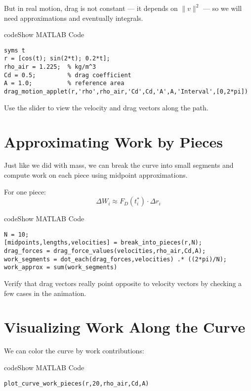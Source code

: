 \documentclass{ximera}
\begin{document}
But in real motion, drag is not constant — it depends on $\|v\|^2$ — so we will need approximations and eventually integrals.

\begin{expandable}{code}{Show MATLAB Code}
\begin{verbatim}
syms t
r = [cos(t); sin(2*t); 0.2*t];
rho_air = 1.225;  % kg/m^3
Cd = 0.5;         % drag coefficient
A = 1.0;          % reference area
drag_motion_applet(r,'rho',rho_air,'Cd',Cd,'A',A,'Interval',[0,2*pi])
\end{verbatim}
\end{expandable}

Use the slider to view the velocity and drag vectors along the path.

\section*{Approximating Work by Pieces}

Just like we did with mass, we can break the curve into small segments and compute work on each piece using midpoint approximations.

For one piece:
$$
\Delta W_i \approx F_D(t_i^*) \cdot \Delta r_i
$$

\begin{expandable}{code}{Show MATLAB Code}
\begin{verbatim}
N = 10;
[midpoints,lengths,velocities] = break_into_pieces(r,N);
drag_forces = drag_force_values(velocities,rho_air,Cd,A);
work_segments = dot_each(drag_forces,velocities) .* ((2*pi)/N);
work_approx = sum(work_segments)
\end{verbatim}
\end{expandable}

\begin{problem}
Verify that drag vectors really point opposite to velocity vectors by checking a few cases in the animation. 
\end{problem}

\section*{Visualizing Work Along the Curve}

We can color the curve by work contributions:

\begin{expandable}{code}{Show MATLAB Code}
\begin{verbatim}
plot_curve_work_pieces(r,20,rho_air,Cd,A)
\end{verbatim}
\end{expandable}
\end{document}
